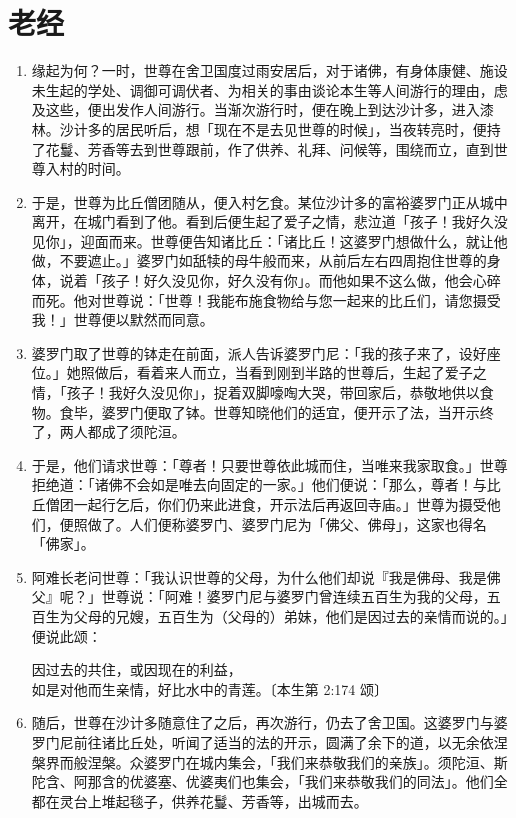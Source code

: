 \section{老经}

\begin{enumerate}\item 缘起为何？一时，世尊在舍卫国度过雨安居后，对于诸佛，有身体康健、施设未生起的学处、调御可调伏者、为相关的事由谈论本生等人间游行的理由，虑及这些，便出发作人间游行。当渐次游行时，便在晚上到达沙计多，进入漆林。沙计多的居民听后，想「现在不是去见世尊的时候」，当夜转亮时，便持了花鬘、芳香等去到世尊跟前，作了供养、礼拜、问候等，围绕而立，直到世尊入村的时间。
\item 于是，世尊为比丘僧团随从，便入村乞食。某位沙计多的富裕婆罗门正从城中离开，在城门看到了他。看到后便生起了爱子之情，悲泣道「孩子！我好久没见你」，迎面而来。世尊便告知诸比丘：「诸比丘！这婆罗门想做什么，就让他做，不要遮止。」婆罗门如舐犊的母牛般而来，从前后左右四周抱住世尊的身体，说着「孩子！好久没见你，好久没有你」。而他如果不这么做，他会心碎而死。他对世尊说：「世尊！我能布施食物给与您一起来的比丘们，请您摄受我！」世尊便以默然而同意。
\item 婆罗门取了世尊的钵走在前面，派人告诉婆罗门尼：「我的孩子来了，设好座位。」她照做后，看着来人而立，当看到刚到半路的世尊后，生起了爱子之情，「孩子！我好久没见你」，捉着双脚嚎啕大哭，带回家后，恭敬地供以食物。食毕，婆罗门便取了钵。世尊知晓他们的适宜，便开示了法，当开示终了，两人都成了须陀洹。
\item 于是，他们请求世尊：「尊者！只要世尊依此城而住，当唯来我家取食。」世尊拒绝道：「诸佛不会如是唯去向固定的一家。」他们便说：「那么，尊者！与比丘僧团一起行乞后，你们仍来此进食，开示法后再返回寺庙。」世尊为摄受他们，便照做了。人们便称婆罗门、婆罗门尼为「佛父、佛母」，这家也得名「佛家」。
\item 阿难长老问世尊：「我认识世尊的父母，为什么他们却说『我是佛母、我是佛父』呢？」世尊说：「阿难！婆罗门尼与婆罗门曾连续五百生为我的父母，五百生为父母的兄嫂，五百生为（父母的）弟妹，他们是因过去的亲情而说的。」便说此颂：\begin{quoting}因过去的共住，或因现在的利益，\\如是对他而生亲情，好比水中的青莲。{\bluefootnotesize 〔本生第 2:174 颂〕}\end{quoting}
\item 随后，世尊在沙计多随意住了之后，再次游行，仍去了舍卫国。这婆罗门与婆罗门尼前往诸比丘处，听闻了适当的法的开示，圆满了余下的道，以无余依涅槃界而般涅槃。众婆罗门在城内集会，「我们来恭敬我们的亲族」。须陀洹、斯陀含、阿那含的优婆塞、优婆夷们也集会，「我们来恭敬我们的同法」。他们全都在灵台上堆起毯子，供养花鬘、芳香等，出城而去。

\end{enumerate}
